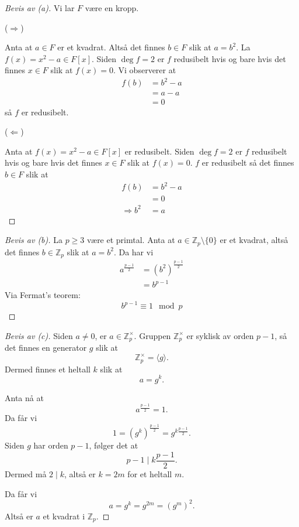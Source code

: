 \documentclass[11pt]{article}
\begin{document}
\begin{proof}[Bevis av (a)] 
    Vi lar $F$ være en kropp.
        
    ($\Rightarrow$) 

    Anta at $a \in F$ er et kvadrat. Altså det finnes $b \in F$ 
    slik at $a = b^2$.  
    La $f(x) = x^2 - a \in F[x]$. Siden $\deg f = 2$ er 
    $f$ redusibelt hvis og bare hvis det finnes $x \in F$ slik at 
    $f(x) = 0$. Vi observerer at 
    \begin{align*}
        f(b) &= b^2 - a \\ 
             &= a - a \\ 
             &= 0
    \end{align*}
    så $f$ er redusibelt. 

    ($\Leftarrow$) 

    Anta at $f(x) = x^2 - a \in F[x]$ er redusibelt. Siden 
    $\deg f = 2$ er $f$ redusibelt hvis og bare hvis det finnes 
    $x \in F$ slik at $f(x) = 0$. $f$ er redusibelt så det finnes 
    $b \in F$ slik at 
    \begin{align*}
        f(b) &= b^2 - a \\ 
             &= 0 \\ 
        \Rightarrow b^2 &= a
    \end{align*}
\end{proof}
\begin{proof}[Bevis av (b)]
    La $p \geq 3$ være et primtal.
    Anta at $a \in \mathbb Z_p \setminus \{0\}$ er et kvadrat, 
    altså det finnes 
    $b \in \mathbb Z_p$ slik at $a = b^2$. Da har vi  
    \begin{align*}
        a^{\frac{p-1}{2}} &= (b^2)^{\frac{p-1}{2}} \\ 
                          &= b^{p-1}
    \end{align*}
    Via Fermat's teorem: 
    \[
        b^{p-1} \equiv 1 \mod p
    \]
\end{proof}
\begin{proof}[Bevis av (c)]
    Siden $a \neq 0$, er $a \in \mathbb Z_p^\times$. Gruppen
    $\mathbb Z_p^\times$ er syklisk av orden $p-1$, så det finnes
    en generator $g$ slik at
    \[
        \mathbb Z_p^\times = \langle g\rangle.
    \]
    Dermed finnes et heltall $k$ slik at
    \[
        a = g^k.
    \]

    Anta nå at
    \[
        a^{\frac{p-1}{2}} = 1.
    \]
    Da får vi
    \[
        1 = (g^k)^{\frac{p-1}{2}} = g^{k\frac{p-1}{2}}.
    \]
    Siden $g$ har orden $p-1$, følger det at
    \[
        p-1 \mid k\frac{p-1}{2}.
    \]
    Dermed må $2 \mid k$, altså er $k=2m$ for et heltall $m$.

    Da får vi
    \[
        a = g^k = g^{2m} = (g^m)^2.
    \]
    Altså er $a$ et kvadrat i $\mathbb Z_p$.
\end{proof}
\end{document}

